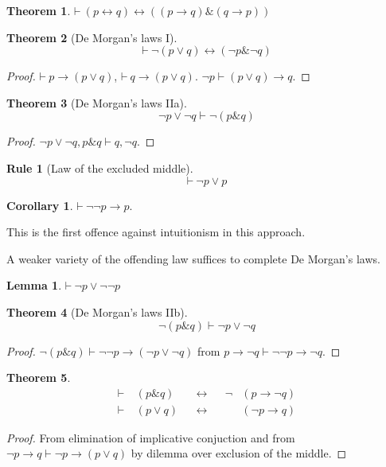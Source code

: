 \documentclass{amsbook}
\newcommand{\infers}{\mathrel\vdash}
\newcommand{\theorem}{\mathord\vdash\medspace}
\newcommand{\then}{\mathrel\rightarrow}
\newcommand{\conj}{\mathrel\&}
\newcommand{\eqv}{\mathrel\leftrightarrow}
\newcommand{\disj}{\mathrel\vee}
\theoremstyle{definition}
\newtheorem{frule}{Rule}[chapter]
\newtheorem{thm}{Theorem}[section]
\newtheorem{lmm}{Lemma}[section]
\newtheorem{crl}{Corollary}[section]
\begin{document}
\begin{thm}
    $\theorem (p \eqv q) \eqv ((p \then q) \conj (q \then p))$
\end{thm}

\begin{thm}[De Morgan's laws I]
    $$\theorem \neg(p \disj q) \eqv (\neg p \conj \neg q)$$
    \begin{proof}
        $\theorem p \then (p \disj q)$, $\theorem q \then (p \disj q)$. $\neg p \infers (p \disj q) \then q$.
    \end{proof}
\end{thm}

\begin{thm}[De Morgan's laws IIa]
    $$\neg p \disj \neg q \infers \neg(p \conj q)$$
    \begin{proof}
        $\neg p \disj \neg q, p \conj q \infers q, \neg q$.
    \end{proof}
\end{thm}

\begin{frule}[Law of the excluded middle]
    $$\theorem \neg p \disj p$$
\end{frule}

\begin{crl}
    $\theorem \neg\neg p \then p$.
\end{crl}

This is the first offence against intuitionism in this approach.

A weaker variety of the offending law suffices to complete De Morgan's laws.

\begin{lmm}
    $\theorem \neg p \disj \neg\neg p$
\end{lmm}

\begin{thm}[De Morgan's laws IIb]
    $$\neg(p \conj q) \infers \neg p \disj \neg q$$
    \begin{proof}
        $\neg(p \conj q) \infers \neg\neg p \then (\neg p \disj \neg q)$ from $p \then \neg q \infers \neg\neg p \then \neg q$.
    \end{proof}
\end{thm}

\begin{thm}
    \begin{align*}
         & \theorem & (p \conj q) &  & \eqv &  & \neg & (p \then \neg q) & \\
         & \theorem & (p \disj q) &  & \eqv &  &      & (\neg p \then q) &
    \end{align*}
    \begin{proof}
        From elimination of implicative conjuction and from $\neg p \then q \infers \neg p \then (p \disj q)$ by dilemma over exclusion of the middle.
    \end{proof}
\end{thm}
\end{document}

